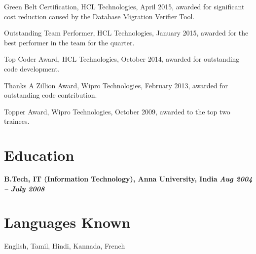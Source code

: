 \documentclass[margin]{resume}
\begin{document}
\begin{resume}
\begin{list2}
\item Green Belt Certification, HCL Technologies, April 2015, awarded for
significant cost reduction caused by the Database Migration Verifier Tool.

\item Outstanding Team Performer, HCL Technologies, January 2015, awarded for the
best performer in the team for the quarter.

\item Top Coder Award, HCL Technologies, October 2014, awarded for outstanding
code development.

\item Thanks A Zillion Award, Wipro Technologies, February 2013, awarded for
outstanding code contribution.

\item Topper Award, Wipro Technologies, October 2009, awarded to the top two
trainees.

\end{list2}

\section{\mysidestyle Education}
\textbf{B.Tech, IT (Information Technology), Anna University, India} \hfill \textbf{\textit{Aug 2004 -- July 2008}}\\

\section{\mysidestyle Languages Known}
English, Tamil, Hindi, Kannada, French

\end{resume}
\end{document}
